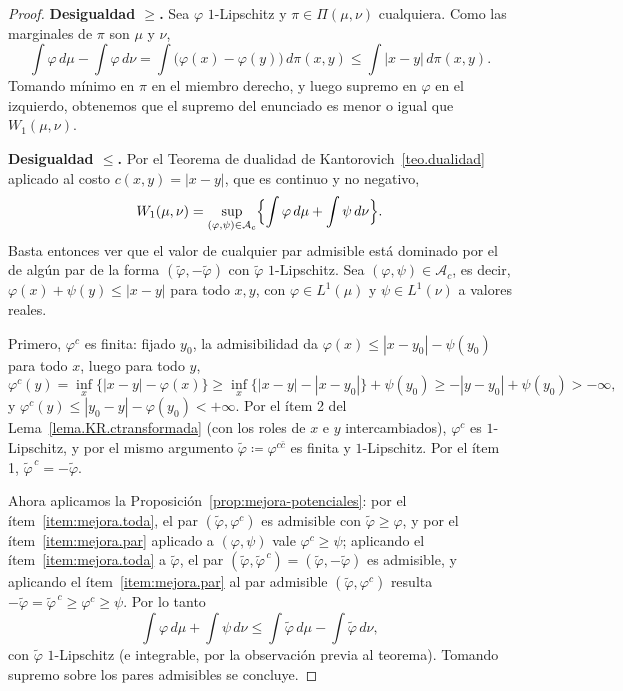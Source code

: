 \documentclass[12pt, a4paper]{amsbook}
\theoremstyle{remark}
\theoremstyle{definition}
\numberwithin{section}{chapter}
\numberwithin{subsection}{section}
\numberwithin{equation}{section}
\numberwithin{figure}{chapter}
\begin{document}
\begin{proof}
\textbf{Desigualdad $\ge$.} Sea $\varphi$ $1$-Lipschitz y $\pi\in\Pi(\mu,\nu)$
cualquiera. Como las marginales de $\pi$ son $\mu$ y $\nu$,
\[
\int\varphi\,d\mu-\int\varphi\,d\nu
=\int\bigl(\varphi(x)-\varphi(y)\bigr)\,d\pi(x,y)
\le\int|x-y|\,d\pi(x,y).
\]
Tomando mínimo en $\pi$ en el miembro derecho, y luego supremo en $\varphi$
en el izquierdo, obtenemos que el supremo del enunciado es menor o igual que
$W_1(\mu,\nu)$.

\medskip
\textbf{Desigualdad $\le$.} Por el Teorema de dualidad de
Kantorovich~\ref{teo.dualidad} aplicado al costo $c(x,y)=|x-y|$, que es
continuo y no negativo,
\[
W_1(\mu,\nu)=\sup_{(\varphi,\psi)\in\mathcal A_c}\Bigl\{\int\varphi\,d\mu+\int\psi\,d\nu\Bigr\}.
\]
Basta entonces ver que el valor de cualquier par admisible está dominado por
el de algún par de la forma $(\widetilde\varphi,-\widetilde\varphi)$ con
$\widetilde\varphi$ $1$-Lipschitz. Sea $(\varphi,\psi)\in\mathcal A_c$, es
decir, $\varphi(x)+\psi(y)\le|x-y|$ para todo $x,y$, con $\varphi\in L^1(\mu)$
y $\psi\in L^1(\nu)$ a valores reales.

Primero, $\varphi^c$ es finita: fijado $y_0$, la admisibilidad da
$\varphi(x)\le|x-y_0|-\psi(y_0)$ para todo $x$, luego para todo $y$,
\[
\varphi^c(y)=\inf_x\{|x-y|-\varphi(x)\}\ge\inf_x\{|x-y|-|x-y_0|\}+\psi(y_0)\ge-|y-y_0|+\psi(y_0)>-\infty,
\]
y $\varphi^c(y)\le|y_0-y|-\varphi(y_0)<+\infty$. Por el ítem 2 del
Lema~\ref{lema.KR.ctransformada} (con los roles de $x$ e $y$ intercambiados),
$\varphi^c$ es $1$-Lipschitz, y por el mismo argumento
$\widetilde\varphi\coloneqq\varphi^{c\bar c}$ es finita y $1$-Lipschitz. Por
el ítem 1, $\widetilde\varphi^{\,c}=-\widetilde\varphi$.

Ahora aplicamos la Proposición~\ref{prop:mejora-potenciales}: por el
ítem~\ref{item:mejora.toda}, el par $(\widetilde\varphi,\varphi^c)$ es
admisible con $\widetilde\varphi\ge\varphi$, y por el
ítem~\ref{item:mejora.par} aplicado a $(\varphi,\psi)$ vale $\varphi^c\ge\psi$;
aplicando el ítem~\ref{item:mejora.toda} a $\widetilde\varphi$, el par
$(\widetilde\varphi,\widetilde\varphi^{\,c})=(\widetilde\varphi,-\widetilde\varphi)$
es admisible, y aplicando el ítem~\ref{item:mejora.par} al par admisible
$(\widetilde\varphi,\varphi^c)$ resulta
$-\widetilde\varphi=\widetilde\varphi^{\,c}\ge\varphi^c\ge\psi$. Por lo tanto
\[
\int\varphi\,d\mu+\int\psi\,d\nu
\le\int\widetilde\varphi\,d\mu-\int\widetilde\varphi\,d\nu,
\]
con $\widetilde\varphi$ $1$-Lipschitz (e integrable, por la observación previa
al teorema). Tomando supremo sobre los pares admisibles se concluye.
\end{proof}
\end{document}
